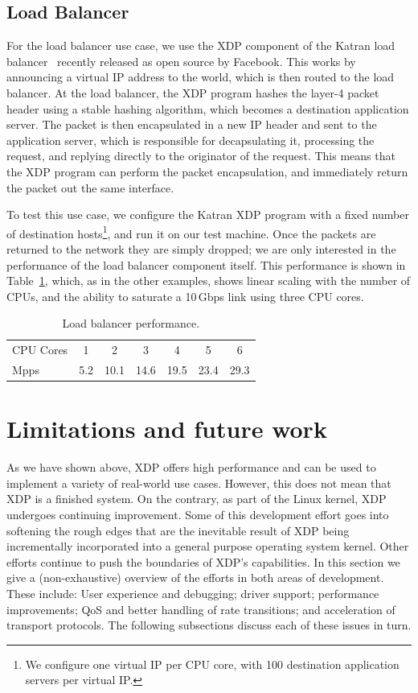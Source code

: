 \documentclass[10pt,sigconf,anonymous]{acmart}
\begin{document}
\subsection{Load Balancer}
\label{sec:load-balancer}
For the load balancer use case, we use the XDP component of the Katran load
balancer~\cite{katran} recently released as open source by Facebook. This works
by announcing a virtual IP address to the world, which is then routed to the
load balancer. At the load balancer, the XDP program hashes the layer-4 packet
header using a stable hashing algorithm, which becomes a destination application
server. The packet is then encapsulated in a new IP header and sent to the
application server, which is responsible for decapsulating it, processing the
request, and replying directly to the originator of the request. This means that
the XDP program can perform the packet encapsulation, and immediately return the
packet out the same interface.

To test this use case, we configure the Katran XDP program with a fixed number
of destination hosts\footnote{We configure one virtual IP per CPU core, with 100
  destination application servers per virtual IP.}, and run it on our test
machine. Once the packets are returned to the network they are simply dropped;
we are only interested in the performance of the load balancer component itself.
This performance is shown in Table~\ref{tbl:load-balancer}, which, as in the
other examples, shows linear scaling with the number of CPUs, and the ability to
saturate a 10\,Gbps link using three CPU cores.

\begin{table}[htbp]
\caption{\label{tbl:load-balancer}Load balancer performance.}
\centering
\begin{tabular}{lcccccc}
  \toprule
  CPU Cores & 1   &  2  &  3  &  4  &  5  &  6  \\
  Mpps & 5.2 & 10.1 & 14.6 & 19.5 & 23.4 & 29.3 \\
\bottomrule
\end{tabular}
\end{table}


\section{Limitations and future work}
\label{sec:limitations}
As we have shown above, XDP offers high performance and can be used to implement
a variety of real-world use cases. However, this does not mean that XDP is a
finished system. On the contrary, as part of the Linux kernel, XDP undergoes
continuing improvement. Some of this development effort goes into softening the
rough edges that are the inevitable result of XDP being incrementally
incorporated into a general purpose operating system kernel. Other efforts
continue to push the boundaries of XDP's capabilities. In this section we give a
(non-exhaustive) overview of the efforts in both areas of development. These
include: User experience and debugging; driver support; performance
improvements; QoS and better handling of rate transitions; and acceleration of
transport protocols. The following subsections discuss each of these issues in
turn.
\end{document}
